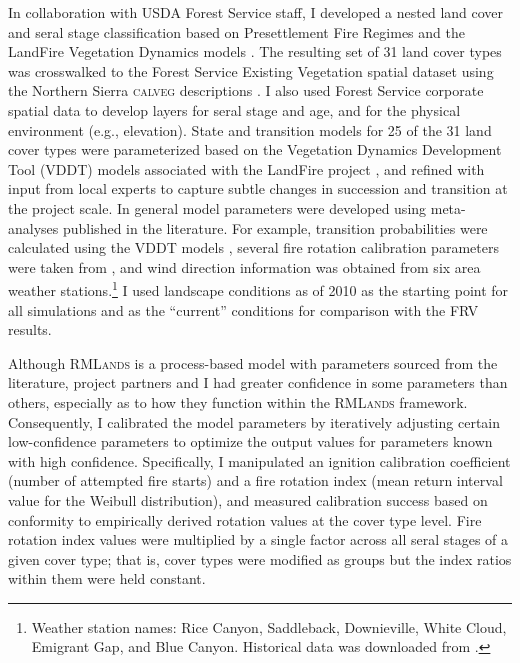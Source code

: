 In collaboration with USDA Forest Service staff, I developed a nested land cover and seral stage classification based on Presettlement Fire Regimes \citep{VandeWater2011} and the LandFire Vegetation Dynamics models \citep{Landfire2007}. The resulting set of 31 land cover types was crosswalked to the Forest Service Existing Vegetation spatial dataset \citep{USDAForestService2009} using the Northern Sierra \textsc{calveg} descriptions \citep{USDAForestService2008}. I also used Forest Service corporate spatial data to develop layers for seral stage and age, and for the physical environment (e.g., elevation). State and transition models for 25 of the 31 land cover types were parameterized based on the Vegetation Dynamics Development Tool (VDDT) models associated with the LandFire project \citep{Landfire2007}, and refined with input from local experts to capture subtle changes in succession and transition at the project scale. In general model parameters were developed using meta-analyses published in the literature. For example, transition probabilities were calculated using the VDDT models \citep{Landfire2007}, several fire rotation calibration parameters were taken from \citet{Mallek2013}, and wind direction information was obtained from six area weather stations.\footnote{Weather station names: Rice Canyon, Saddleback, Downieville, White Cloud, Emigrant Gap, and Blue Canyon. Historical data was downloaded from .} I used landscape conditions as of 2010 as the starting point for all simulations and as the ``current'' conditions for comparison with the FRV results.

Although \textsc{RMLands} is a process-based model with parameters sourced from the literature, project partners and I had greater confidence in some parameters than others, especially as to how they function within the \textsc{RMLands} framework. Consequently, I calibrated the model parameters by iteratively adjusting certain low-confidence parameters to optimize the output values for parameters known with high confidence. Specifically, I manipulated an ignition calibration coefficient (number of attempted fire starts) and a fire rotation index (mean return interval value for the Weibull distribution), and measured calibration success based on conformity to empirically derived rotation values at the cover type level. Fire rotation index values were multiplied by a single factor across all seral stages of a given cover type; that is, cover types were modified as groups but the index ratios within them were held constant.

